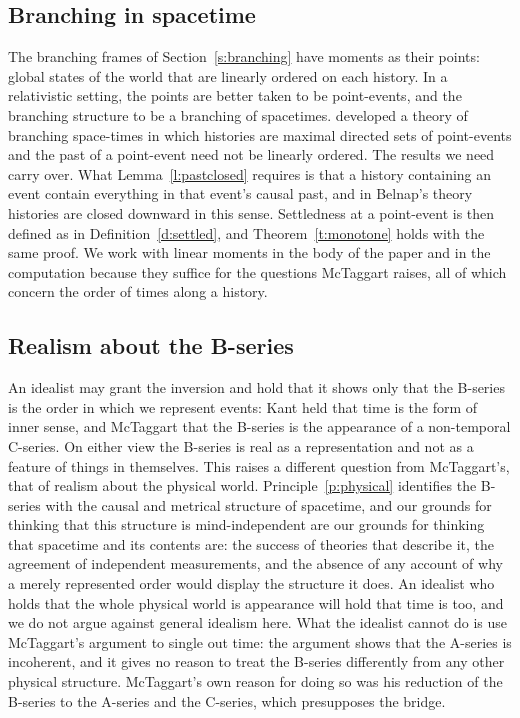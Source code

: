 \documentclass{situationist-preprint}
\begin{document}
\subsection{Branching in spacetime}

The branching frames of Section~\ref{s:branching} have moments as their points: global states of the world that are linearly ordered on each history. In a relativistic setting, the points are better taken to be point-events, and the branching structure to be a branching of spacetimes. \citet{Belnap1992} developed a theory of branching space-times in which histories are maximal directed sets of point-events and the past of a point-event need not be linearly ordered. The results we need carry over. What Lemma~\ref{l:pastclosed} requires is that a history containing an event contain everything in that event's causal past, and in Belnap's theory histories are closed downward in this sense. Settledness at a point-event is then defined as in Definition~\ref{d:settled}, and Theorem~\ref{t:monotone} holds with the same proof. We work with linear moments in the body of the paper and in the computation because they suffice for the questions McTaggart raises, all of which concern the order of times along a history.

\subsection{Realism about the B-series}

An idealist may grant the inversion and hold that it shows only that the B-series is the order in which we represent events: Kant held that time is the form of inner sense, and McTaggart that the B-series is the appearance of a non-temporal C-series. On either view the B-series is real as a representation and not as a feature of things in themselves. This raises a different question from McTaggart's, that of realism about the physical world. Principle~\ref{p:physical} identifies the B-series with the causal and metrical structure of spacetime, and our grounds for thinking that this structure is mind-independent are our grounds for thinking that spacetime and its contents are: the success of theories that describe it, the agreement of independent measurements, and the absence of any account of why a merely represented order would display the structure it does. An idealist who holds that the whole physical world is appearance will hold that time is too, and we do not argue against general idealism here. What the idealist cannot do is use McTaggart's argument to single out time: the argument shows that the A-series is incoherent, and it gives no reason to treat the B-series differently from any other physical structure. McTaggart's own reason for doing so was his reduction of the B-series to the A-series and the C-series, which presupposes the bridge.
\end{document}
